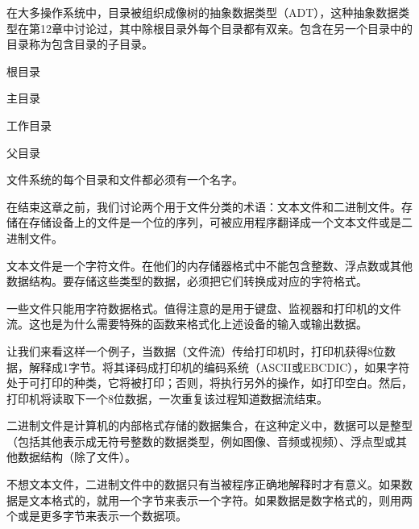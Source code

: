 在大多操作系统中，目录被组织成像树的抽象数据类型（ADT），这种抽象数据类型在第12章中讨论过，其中除根目录外每个目录都有双亲。包含在另一个目录中的目录称为包含目录的子目录。\par
根目录\par
主目录\par
工作目录\par
父目录\par
文件系统的每个目录和文件都必须有一个名字。\par
在结束这章之前，我们讨论两个用于文件分类的术语：文本文件和二进制文件。存储在存储设备上的文件是一个位的序列，可被应用程序翻译成一个文本文件或是二进制文件。\par
文本文件是一个字符文件。在他们的内存储器格式中不能包含整数、浮点数或其他数据结构。要存储这些类型的数据，必须把它们转换成对应的字符格式。\par
一些文件只能用字符数据格式。值得注意的是用于键盘、监视器和打印机的文件流。这也是为什么需要特殊的函数来格式化上述设备的输入或输出数据。\par
让我们来看这样一个例子，当数据（文件流）传给打印机时，打印机获得8位数据，解释成1字节。将其译码成打印机的编码系统（ASCII或EBCDIC），如果字符处于可打印的种类，它将被打印；否则，将执行另外的操作，如打印空白。然后，打印机将读取下一个8位数据，一次重复该过程知道数据流结束。\par
二进制文件是计算机的内部格式存储的数据集合，在这种定义中，数据可以是整型（包括其他表示成无符号整数的数据类型，例如图像、音频或视频）、浮点型或其他数据结构（除了文件）。\par
不想文本文件，二进制文件中的数据只有当被程序正确地解释时才有意义。如果数据是文本格式的，就用一个字节来表示一个字符。如果数据是数字格式的，则用两个或是更多字节来表示一个数据项。
